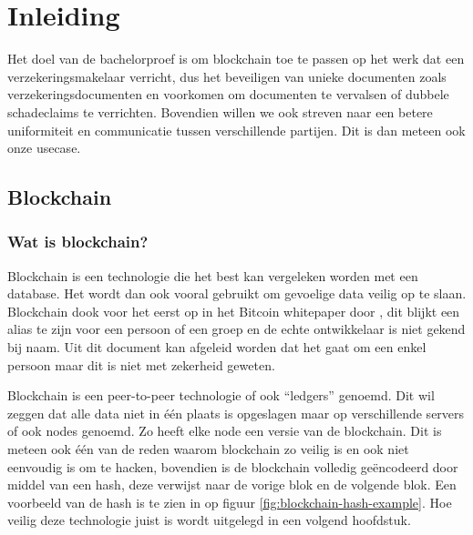 
\chapter{Inleiding}
\label{ch:inleiding}

Het doel van de bachelorproef is om blockchain toe te passen op het werk dat een verzekeringsmakelaar verricht, dus het beveiligen van unieke documenten zoals verzekeringsdocumenten en voorkomen om documenten te vervalsen of dubbele schadeclaims te verrichten. Bovendien willen we ook streven naar een betere uniformiteit en communicatie tussen verschillende partijen. Dit is dan meteen ook onze usecase.

\section{Blockchain}
\label{sec:stand-van-zaken}


\subsection{Wat is blockchain?}

Blockchain is een technologie die het best kan vergeleken worden met een database. Het wordt dan ook vooral gebruikt om gevoelige data veilig op te slaan. Blockchain dook voor het eerst op in het Bitcoin whitepaper door \textcite{Nakamoto2008}, dit blijkt een alias te zijn voor een persoon of een groep en de echte ontwikkelaar is niet gekend bij naam. Uit dit document kan afgeleid worden dat het gaat om een enkel persoon maar dit is niet met zekerheid geweten. 

 Blockchain is een peer-to-peer technologie of ook ``ledgers'' genoemd. Dit wil zeggen dat alle data niet in één plaats is opgeslagen maar op verschillende servers of ook nodes genoemd. Zo heeft elke node een versie van de blockchain. Dit is meteen ook één van de reden waarom blockchain zo veilig is en ook niet eenvoudig is om te hacken, bovendien is de blockchain volledig geëncodeerd door middel van een hash, deze verwijst naar de vorige blok en de volgende blok. Een voorbeeld van de hash is te zien in op figuur \ref{fig:blockchain-hash-example}. Hoe veilig deze technologie juist is wordt uitgelegd in een volgend hoofdstuk.
 
